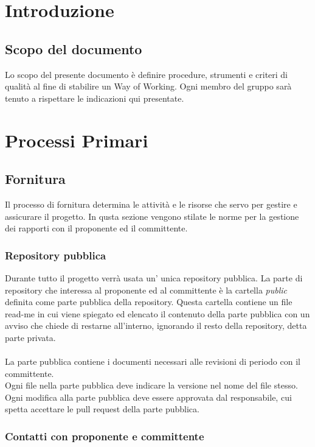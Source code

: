 \documentclass[a4paper, 12pt]{article}
\begin{document}
\makefrontpage

\makeversioni

\tableofcontents
\pagebreak

\section{Introduzione}
\subsection{Scopo del documento}
Lo scopo del presente documento è definire procedure, strumenti e criteri di qualità al fine di stabilire un Way of Working. Ogni membro del gruppo sarà tenuto a rispettare le indicazioni qui presentate.

\section{Processi Primari}
\subsection{Fornitura}\label{fornitura}
Il processo di fornitura determina le attività e le risorse che servo per gestire e assicurare il progetto. In qusta sezione vengono stilate le norme per la gestione dei rapporti con il proponente ed il committente.
\subsubsection{Repository pubblica}
Durante tutto il progetto verrà usata un' unica repository pubblica. La parte di repository che interessa al proponente ed al committente è la cartella \textit{public} definita come parte pubblica della repository. Questa cartella contiene un file read-me in cui viene spiegato ed elencato il contenuto della parte pubblica con un avviso che chiede di restarne all'interno, ignorando il resto della repository, detta parte privata.\\\\
La parte pubblica contiene i documenti necessari alle revisioni di periodo con il committente.\\
Ogni file nella parte pubblica deve indicare la versione nel nome del file stesso.\\
Ogni modifica alla parte pubblica deve essere approvata dal responsabile, cui spetta accettare le pull request della parte pubblica.
\subsubsection{Contatti con proponente e committente}
\end{document}
